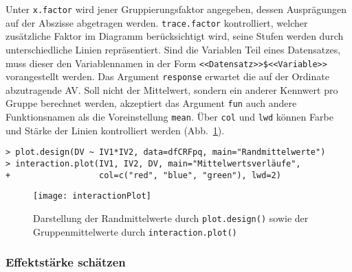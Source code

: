 Unter \lstinline!x.factor! wird jener Gruppierungsfaktor angegeben, dessen Ausprägungen auf der Abszisse abgetragen werden. \lstinline!trace.factor! kontrolliert, welcher zusätzliche Faktor im Diagramm berücksichtigt wird, seine Stufen werden durch unterschiedliche Linien repräsentiert. Sind die Variablen Teil eines Datensatzes, muss dieser den Variablennamen in der Form \lstinline!<<Datensatz>>$<<Variable>>! vorangestellt werden. Das Argument \lstinline!response! erwartet die auf der Ordinate abzutragende AV\@. Soll nicht der Mittelwert, sondern ein anderer Kennwert pro Gruppe berechnet werden, akzeptiert das Argument \lstinline!fun! auch andere Funktionsnamen als die Voreinstellung \lstinline!mean!. Über \lstinline!col! und \lstinline!lwd! können Farbe und Stärke der Linien kontrolliert werden (Abb.\ \ref{fig:interactionPlot}).
\begin{lstlisting}
> plot.design(DV ~ IV1*IV2, data=dfCRFpq, main="Randmittelwerte")
> interaction.plot(IV1, IV2, DV, main="Mittelwertsverläufe",
+                  col=c("red", "blue", "green"), lwd=2)
\end{lstlisting}

\begin{figure}[ht]
\centering
\texttt{[image: interactionPlot]}
\vspace*{-0.5em}
\caption{Darstellung der Randmittelwerte durch \lstinline!plot.design()! sowie der Gruppenmittelwerte durch \lstinline!interaction.plot()!}
\label{fig:interactionPlot}
\end{figure}

\subsubsection{Effektstärke schätzen}

